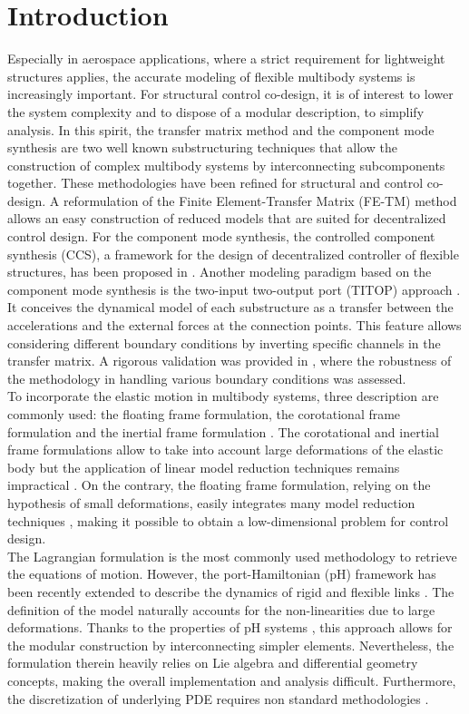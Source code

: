 \documentclass{svjour3}                     %
\begin{document}
\section{Introduction}
\label{intro}
Especially in aerospace applications, where a strict requirement for lightweight structures applies, the accurate modeling  of flexible multibody systems is increasingly important. For structural control co-design, it is of interest to lower the system complexity and to dispose of a modular description, to simplify analysis. In this spirit, the transfer matrix method \cite{Rui2005} and the component mode synthesis \cite{HurtyCMS} are two well known substructuring techniques that allow the construction of complex multibody systems by interconnecting subcomponents together. These methodologies have been refined for structural and control co-design. A reformulation of the Finite Element-Transfer Matrix (FE-TM) method \cite{TAN199047} allows an easy construction of reduced models that are suited for decentralized control design. For the component mode synthesis, the controlled component synthesis (CCS), a framework for the design of decentralized controller of flexible structures, has been proposed in \cite{YoungCMS}. Another modeling paradigm based on the component mode synthesis is the two-input two-output port (TITOP) approach \cite{TITOP}. It conceives the dynamical model of each substructure as a transfer between the accelerations and the external forces at the connection points. This feature allows considering different boundary conditions by inverting specific channels in the transfer matrix. A rigorous validation was provided in \cite{Perez,SANFEDINO2018128}, where the robustness of the methodology in handling various boundary conditions was assessed. \\
\indent To incorporate the elastic motion in multibody systems, three description are commonly used: the floating frame formulation, the corotational frame formulation and the inertial frame formulation \cite{Ellenbroek2018}. The corotational and inertial frame formulations allow to take into account large deformations of the elastic body but the application of linear model reduction techniques remains impractical \cite{Noor_rev}. On the contrary, the floating frame formulation, relying on the hypothesis of small deformations, easily integrates many model reduction techniques \cite{NOWAKOWSKI201240}, making it possible to obtain a low-dimensional problem for control design. \\
\indent The Lagrangian formulation is the most commonly used methodology to retrieve the equations of motion. However, the port-Hamiltonian (pH) framework \cite{bookPHs} has been recently extended to describe the dynamics of rigid and flexible links \cite{macchelli_fl,macchelli_flrig}. The definition of the model naturally accounts for the non-linearities due to large deformations. Thanks to the properties of pH systems \cite{CerveraIntFinite},  this approach allows for the modular construction by interconnecting simpler elements. Nevertheless, the formulation therein heavily relies on Lie algebra and differential geometry concepts, making the overall implementation and analysis difficult. Furthermore, the discretization of underlying PDE requires non standard methodologies \cite{Golo}. \\
\end{document}
